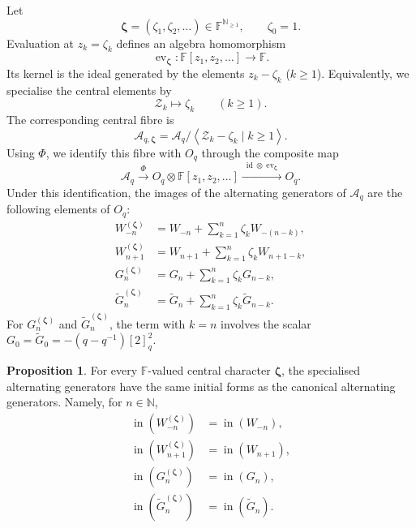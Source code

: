 \documentclass[11pt]{extarticle}
\theoremstyle{definition}
\newtheorem{proposition}[theorem]{Proposition}
\theoremstyle{remark}
\numberwithin{equation}{section}
\newcommand{\F}{\mathbb F}
\newcommand{\N}{\mathbb N}
\newcommand{\Oq}{O_q}
\newcommand{\Aq}{\mathcal A_q}
\newcommand{\Aqfib}[1]{\mathcal A_{q,#1}}
\newcommand{\init}{\operatorname{in}}
\newcommand{\Zconv}{\mathcal Z}
\begin{document}
Let
\[
        \boldsymbol\zeta=(\zeta_1,\zeta_2,\ldots)\in\F^{\N_{\geq1}},
        \qquad
        \zeta_0=1 .
\]
Evaluation at \(z_k=\zeta_k\) defines an algebra homomorphism
\[
        \operatorname{ev}_{\boldsymbol\zeta}:
        \F[z_1,z_2,\ldots]\longrightarrow\F .
\]
Its kernel is the ideal generated by the elements $z_k-\zeta_k$
($k\geq1$).  Equivalently, we specialise the central elements by
\[
        \Zconv_k\longmapsto \zeta_k
        \qquad(k\geq1).
\]
The corresponding central fibre is
\[
        \Aqfib{\boldsymbol\zeta}
        =
        \Aq\big/
        \left\langle
        \Zconv_k-\zeta_k\mid k\geq1
        \right\rangle .
\]
Using \(\Phi\), we identify this fibre with \(\Oq\) through the composite
map
\[
        \Aq
        \xrightarrow{\ \Phi\ }
        \Oq\otimes\F[z_1,z_2,\ldots]
        \xrightarrow{\ \operatorname{id}\otimes
        \operatorname{ev}_{\boldsymbol\zeta}\ }
        \Oq .
\]
Under this identification, the images of the alternating generators of
\(\Aq\) are the following elements of \(\Oq\):
\begin{align}
W_{-n}^{(\boldsymbol\zeta)}
 &=W_{-n}+\sum_{k=1}^{n}\zeta_kW_{-(n-k)},
\label{eq:special-Wminus}\\
W_{n+1}^{(\boldsymbol\zeta)}
 &=W_{n+1}+\sum_{k=1}^{n}\zeta_kW_{n+1-k},
\label{eq:special-Wplus}\\
G_n^{(\boldsymbol\zeta)}
 &=G_n+\sum_{k=1}^{n}\zeta_kG_{n-k},
\label{eq:special-G}\\
\widetilde G_n^{(\boldsymbol\zeta)}
 &=\widetilde G_n+\sum_{k=1}^{n}\zeta_k\widetilde G_{n-k}.
\label{eq:special-tG}
\end{align}
For \(G_n^{(\boldsymbol\zeta)}\) and
\(\widetilde G_n^{(\boldsymbol\zeta)}\), the term with \(k=n\) involves the
scalar \(G_0=\widetilde G_0=-(q-q^{-1})[2]_q^2\).

\begin{proposition}
\label{prop:special-leading}
For every $\F$-valued central character \(\boldsymbol\zeta\), the specialised
alternating generators have the same initial forms as the canonical
alternating generators.  Namely, for \(n\in\N\),
\begin{align}
\init(W_{-n}^{(\boldsymbol\zeta)})
 &=\init(W_{-n}),
\label{eq:special-leading-Wminus}\\
\init(W_{n+1}^{(\boldsymbol\zeta)})
 &=\init(W_{n+1}),
\label{eq:special-leading-Wplus}\\
\init(G_n^{(\boldsymbol\zeta)})
 &=\init(G_n),
\label{eq:special-leading-G}\\
\init(\widetilde G_n^{(\boldsymbol\zeta)})
 &=\init(\widetilde G_n).
\label{eq:special-leading-tG}
\end{align}
\end{proposition}
\end{document}
